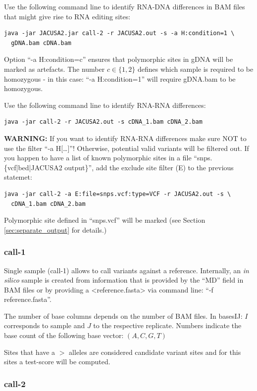 \documentclass[10pt,a4paper,final]{article}
\begin{document}
Use the following command line to identify RNA-DNA differences in BAM files that might give rise to
RNA editing sites:
\begin{verbatim}
java -jar JACUSA2.jar call-2 -r JACUSA2.out -s -a H:condition=1 \
  gDNA.bam cDNA.bam
\end{verbatim}
Option ``-a H:condition=c'' ensures that polymorphic sites in gDNA will be marked as 
artefacts. The number $c \in \{1, 2\}$ defines which sample is required to be homozygous - in this 
case: ``-a H:condition=1'' will require gDNA.bam to be homozygous.

Use the following command line to identify RNA-RNA differences:
\begin{verbatim}
java -jar call-2 -r JACUSA2.out -s cDNA_1.bam cDNA_2.bam
\end{verbatim}
\textbf{WARNING:} If you want to identify RNA-RNA differences make sure NOT to use the filter ``-a
H[\ldots]''! Otherwise, potential valid variants will be filtered out. If you happen to have a list
of known polymorphic sites in a file ``snps.\{vcf|bed|JACUSA2 output\}'', add the exclude site filter (E)
to the previous statemet:
\begin{verbatim}
java -jar call-2 -a E:file=snps.vcf:type=VCF -r JACUSA2.out -s \
  cDNA_1.bam cDNA_2.bam
\end{verbatim}
Polymorphic site defined in ``snps.vcf'' will be marked (see Section \ref{sec:separate_output} for details.)
\subsubsection{call-1}\label{sec:call_1}
Single sample (call-1) allows to call variants against a reference. 
Internally, an \textit{in silico} sample is created from information that is provided by the ``MD'' field 
in BAM files or by providing a <reference.fasta> via command line: ``-f reference.fasta''.

The number of base columns depends on the number of BAM files. In basesIJ: $I$
corresponds to sample and $J$ to the respective replicate. Numbers indicate the base count of the
following base vector: $(A, C, G, T)$

Sites that have a $>$ alleles are considered candidate variant sites and for this sites a test-score will be computed.
\subsubsection{call-2}\label{sec:call_2}
\end{document}
